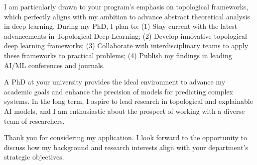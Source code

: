 \documentclass[10pt,a4paper,roman]{moderncv}
\begin{document}
I am particularly drawn to your program's emphasis on topological frameworks, 
which perfectly aligns with my ambition to advance abstract theoretical analysis in deep learning. 
During my PhD, I plan to: 
(1) Stay current with the latest advancements in Topological Deep Learning; 
(2) Develop innovative topological deep learning frameworks; 
(3) Collaborate with interdisciplinary teams to apply these frameworks to practical problems; 
(4) Publish my findings in leading AI/ML conferences and journals.

A PhD at your university provides the ideal environment to advance my academic goals 
and enhance the precision of models for predicting complex systems. 
In the long term, I aspire to lead research in topological and explainable AI models, 
and I am enthusiastic about the prospect of working with a diverse team of researchers.

Thank you for considering my application. 
I look forward to the opportunity to discuss how my background and research interests align with your department's strategic objectives.


\makeletterclosing
\end{document}
